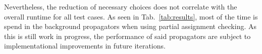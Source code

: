 Nevertheless, the reduction of necessary choices does not correlate with the overall runtime for all test cases. As seen in Tab.~\ref{tab:results}, most of the time is spend in the background propagators when using partial assignment checking. As this is still work in progress, the performance of said propagators are subject to implementational improvements in future iterations.




